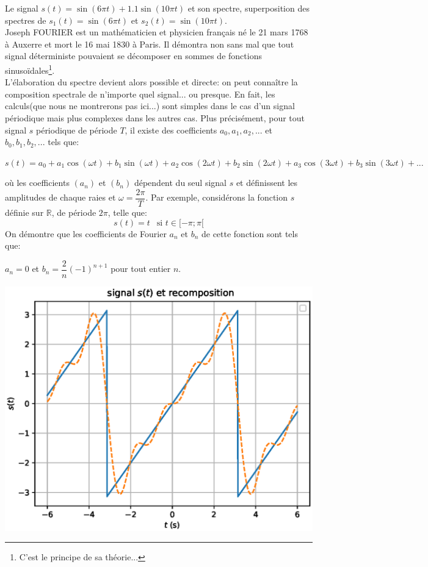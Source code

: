 \documentclass[11pt,a4paper]{article}
\newcounter{exem}
\begin{document}
Le signal $s(t)=\sin(6\pi t)+ 1.1\sin(10\pi t)$ et son spectre, superposition des spectres de $s_1(t)=\sin(6\pi t)$ et $s_2(t)=\sin(10\pi t)$.\\
Joseph FOURIER est un mathématicien et physicien français né le 21 mars 1768 à Auxerre et mort le 16 mai 1830 à Paris. Il démontra non sans mal que tout signal déterministe pouvaient se décomposer en sommes de fonctions sinusoïdales\footnote{C'est le principe de sa théorie...}.\\
L'élaboration du spectre devient alors possible et directe: on peut connaître la composition spectrale de n'importe quel signal... ou presque. En fait, les calculs(que nous ne montrerons pas ici...) sont simples dans le cas d'un signal périodique mais plus complexes dans les autres cas.
Plus précisément, pour tout signal $s$ périodique de période $T$, il existe des coefficients $a_0,a_1,a_2,...$ et $b_0,b_1,b_2,...$ tels que:\\
\begin{center}
$s(t)=a_0+a_1\cos(\omega t)+b_1\sin(\omega t)+a_2\cos(2\omega t)+b_2\sin(2\omega t)+a_3\cos(3\omega t)+b_3\sin(3\omega t)+ ...$
\end{center}
où les coefficients $(a_n)$ et $(b_n)$ dépendent du seul signal $s$ et définissent les amplitudes de chaque raies et $\omega=\dfrac{2\pi}{T}$. Par exemple, considérons la fonction $s$ définie sur $\mathbb{R}$, de période $2\pi$,
telle que: 
\[
s(t)=t\ \ \mbox{ si } t\in[-\pi;\pi[
\]
On démontre que les coefficients de Fourier $a_n$ et $b_n$ de cette fonction sont tels que:
\begin{center}
$a_n=0$ et  $b_n=\dfrac{2}{n}(-1)^{n+1}$ pour tout entier $n$. \\
\begin{minipage}{0.5\linewidth}
\includegraphics[scale=0.75]{exempleseriefourier.eps} 

\end{minipage}
\end{center}
\end{document}

